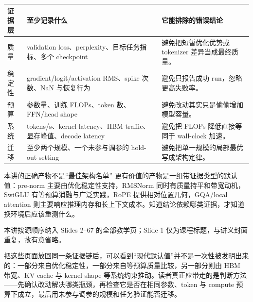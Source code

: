 \begin{longtable}{p{}p{}p{}}
\toprule
证据层 & 至少记录什么 & 它能排除的错误结论 \\
\midrule
质量 & validation loss、perplexity、目标任务指标、多个 checkpoint & 避免把短暂优化优势或 tokenizer 差异当成最终质量。 \\
稳定性 & gradient/logit/activation RMS、spike 次数、NaN 与恢复行为 & 避免只报告成功 run，忽略更高失败率。 \\
预算 & 参数量、训练 FLOPs、token 数、FFN/head shape & 避免改动其实只是偷偷增加模型容量。 \\
系统 & tokens/s、kernel latency、HBM traffic、显存峰值、decode latency & 避免把 FLOPs 降低直接等同于 wall-clock 加速。 \\
迁移 & 至少两个规模、一个未参与调参的 hold-out setting & 避免把单一规模的局部最优写成架构定律。 \\
\bottomrule
\end{longtable}

\begin{importantbox}{本讲的正确产物不是“最佳架构名单”}
更有价值的产物是一组带证据类型的默认值：pre-norm 主要由优化稳定性支持，RMSNorm 同时有质量持平和带宽动机，SwiGLU 有等预算消融与广泛实践，RoPE 提供相对位置几何，GQA/local attention 则主要响应推理内存和长上下文成本。知道结论依赖哪类证据，才知道换环境后应该重测什么。
\end{importantbox}

本讲按源顺序纳入 Slides 2--67 的全部教学页；Slide 1 仅为课程标题，与讲义封面重复，故有意省略。

把这些页面放回同一条证据链后，可以看到“现代默认值”并不是一次性被发明出来的：一部分来自优化稳定性，一部分来自等预算质量比较，另一部分则由 HBM 带宽、KV cache 与 kernel shape 等系统约束推动。读者真正应带走的是判断方法——先确认改动解决哪类瓶颈，再检查它是否在相同参数、token 与 compute 预算下成立，最后用未参与调参的规模和任务验证能否迁移。

